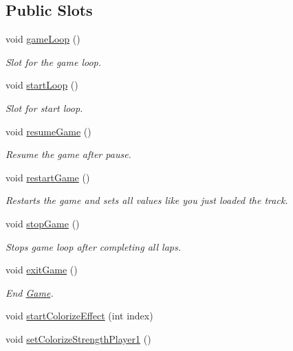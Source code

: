 \subsection*{Public Slots}
\begin{DoxyCompactItemize}
\item 
void \mbox{\hyperlink{class_world_af2b4ba4ce188c2770f13108e4277414f}{game\+Loop}} ()
\begin{DoxyCompactList}\small\item\em Slot for the game loop. \end{DoxyCompactList}\item 
void \mbox{\hyperlink{class_world_a7ddcac8a4f5c94a846476b2832878f26}{start\+Loop}} ()
\begin{DoxyCompactList}\small\item\em Slot for start loop. \end{DoxyCompactList}\item 
void \mbox{\hyperlink{class_world_a1b140a6e52459ad1ea23b21d057d1b39}{resume\+Game}} ()
\begin{DoxyCompactList}\small\item\em Resume the game after pause. \end{DoxyCompactList}\item 
void \mbox{\hyperlink{class_world_a17d5c950e12bc73f8a45f598564e3f34}{restart\+Game}} ()
\begin{DoxyCompactList}\small\item\em Restarts the game and sets all values like you just loaded the track. \end{DoxyCompactList}\item 
void \mbox{\hyperlink{class_world_a273f35605dbdafbbd9a819d62b043d95}{stop\+Game}} ()
\begin{DoxyCompactList}\small\item\em Stops game loop after completing all laps. \end{DoxyCompactList}\item 
void \mbox{\hyperlink{class_world_af9f6c83d12bb7d513eddba723f69f562}{exit\+Game}} ()
\begin{DoxyCompactList}\small\item\em End \mbox{\hyperlink{class_game}{Game}}. \end{DoxyCompactList}\item 
void \mbox{\hyperlink{class_world_adff73761217839dc0bfa3df65cfea801}{start\+Colorize\+Effect}} (int index)
\item 
void \mbox{\hyperlink{class_world_a493703c5c33d963cf7580c027038874d}{set\+Colorize\+Strength\+Player1}} ()

\end{DoxyCompactItemize}
